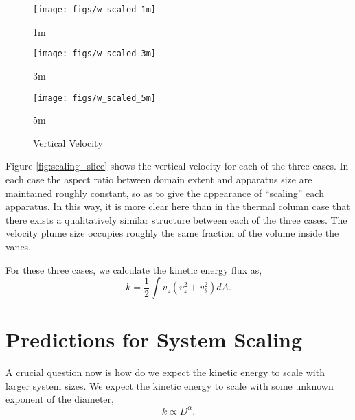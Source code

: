 \documentclass[english]{article}
\begin{document}
%
%


\begin{figure}[!htb]
\texttt{[image: figs/w\_scaled\_1m]}
\caption*{1m}\label{fig:1m_vz}
\endminipage\hfill
{}
\texttt{[image: figs/w\_scaled\_3m]}
\caption*{3m}\label{fig:3m_vz}
\endminipage\hfill
{}%
\texttt{[image: figs/w\_scaled\_5m]}
  \caption*{5m}\label{fig:5m_vz}
\endminipage
\caption{Vertical Velocity}
\end{figure}
 
Figure \ref{fig:scaling_slice} shows the vertical velocity for each of the three cases. In each case the aspect ratio between domain extent
and apparatus size are maintained roughly constant, so as to give the appearance of ``scaling'' each apparatus. In this way, it is more 
clear here than in the thermal column case that there exists a qualitatively similar structure between each of the three cases. The velocity plume 
size occupies roughly the same fraction of the volume inside the vanes. 

For these three cases, we calculate the kinetic energy flux as, 
\begin{equation}
k = \frac{1}{2} \int v_z (v_z^2 + v_{\theta}^2) dA. 
\label{ke_flux}
\end{equation}


%
%

\section*{Predictions for System Scaling}


A crucial question now is how do we expect the kinetic energy to scale with larger system sizes. We expect the 
kinetic energy to scale with some unknown exponent of the diameter, 
\begin{equation}
k \propto D^\alpha. 
\end{equation}
\end{document}
